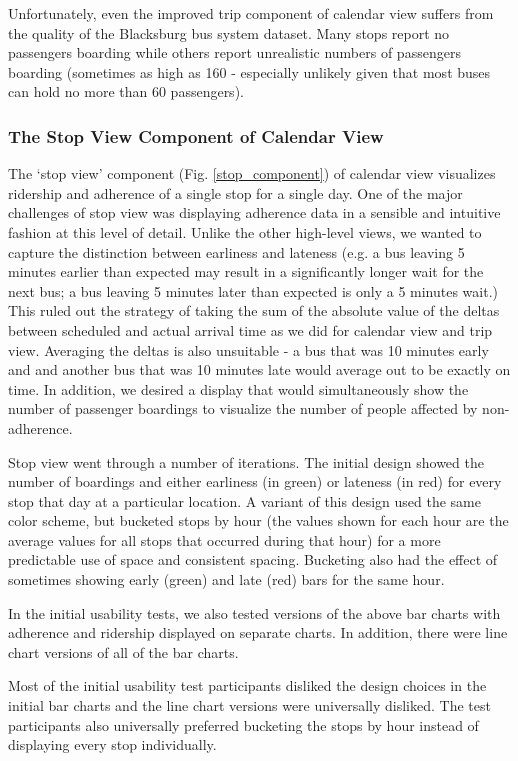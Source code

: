 \documentclass[journal]{vgtc}                %
\begin{document}
Unfortunately, even the improved trip component of calendar view suffers from the quality of the Blacksburg bus system dataset. Many stops report no passengers boarding while others report unrealistic numbers of passengers boarding (sometimes as high as 160 - especially unlikely given that most buses can hold no more than 60 passengers).

\subsubsection{The Stop View Component of Calendar View}
The `stop view' component (Fig. \ref{stop_component}) of calendar view visualizes ridership and adherence of a single stop for a single day. One of the major challenges of stop view was displaying adherence data in a sensible and intuitive fashion at this level of detail. Unlike the other high-level views, we wanted to capture the distinction between earliness and lateness (e.g. a bus leaving 5 minutes earlier than expected may result in a significantly longer wait for the next bus; a bus leaving 5 minutes later than expected is only a 5 minutes wait.) This ruled out the strategy of taking the sum of the absolute value of the deltas between scheduled and actual arrival time as we did for calendar view and trip view. Averaging the deltas is also unsuitable - a bus that was 10 minutes early and and another bus that was 10 minutes late would average out to be exactly on time. In addition, we desired a display that would simultaneously show the number of passenger boardings to visualize the number of people affected by non-adherence.

Stop view went through a number of iterations. The initial design showed the number of boardings and either earliness (in green) or lateness (in red) for every stop that day at a particular location. A variant of this design used the same color scheme, but bucketed stops by hour (the values shown for each hour are the average values for all stops that occurred during that hour) for a more predictable use of space and consistent spacing. Bucketing also had the effect of sometimes showing early (green) and late (red) bars for the same hour.

In the initial usability tests, we also tested versions of the above bar charts with adherence and ridership displayed on separate charts. In addition, there were line chart versions of all of the bar charts.

Most of the initial usability test participants disliked the design choices in the initial bar charts and the line chart versions were universally disliked. The test participants also universally preferred bucketing the stops by hour instead of displaying every stop individually.
\end{document}
